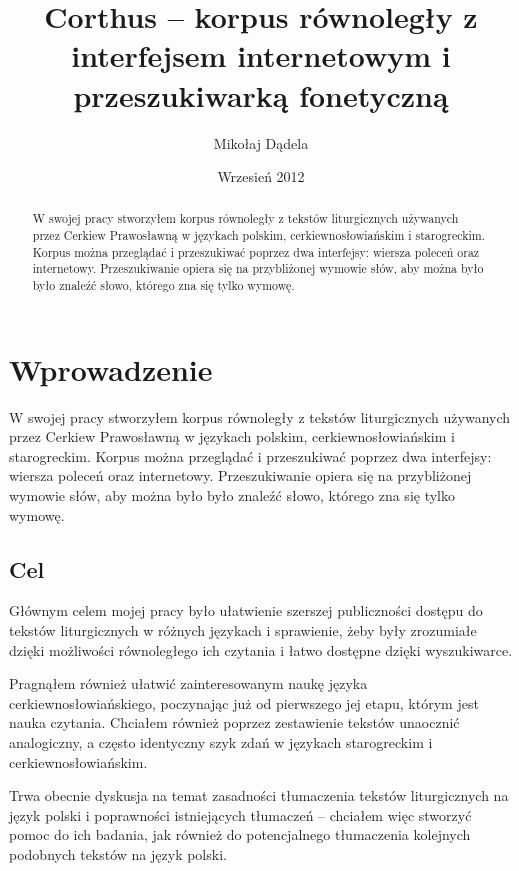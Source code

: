 \documentclass{pracamgr}
\author{Mikołaj Dądela}
\title{Corthus -- korpus równoległy z interfejsem internetowym i
  przeszukiwarką fonetyczną}
\date{Wrzesień 2012}
\begin{document}
\maketitle

\begin{abstract}
  W swojej pracy stworzyłem korpus równoległy z tekstów liturgicznych
  używanych przez Cerkiew Prawosławną w językach polskim,
  cerkiewno\-{}słowiańskim i staro\-{}greckim. Korpus można przeglądać i
  przeszukiwać poprzez dwa interfejsy: wiersza poleceń oraz
  internetowy. Przeszukiwanie opiera się na przybliżonej wymowie słów,
  aby można było było znaleźć słowo, którego zna się tylko wymowę.
\end{abstract}

\tableofcontents


\chapter{Wprowadzenie}

W swojej pracy stworzyłem korpus równoległy z tekstów liturgicznych
używanych przez Cerkiew Prawosławną w językach polskim,
cerkiewno\-{}słowiańskim i staro\-{}greckim. Korpus można przeglądać i
przeszukiwać poprzez dwa interfejsy: wiersza poleceń oraz
internetowy. Przeszukiwanie opiera się na przybliżonej wymowie słów,
aby można było było znaleźć słowo, którego zna się tylko wymowę.

\section{Cel}\label{cel}

Głównym celem mojej pracy było ułatwienie szerszej publiczności
dostępu do tekstów liturgicznych w różnych językach i sprawienie, żeby
były zrozumiałe dzięki możliwości równoległego ich czytania i łatwo
dostępne dzięki wyszukiwarce.

Pragnąłem również ułatwić zainteresowanym naukę języka
cerkiewno\-{}słowiańskiego, poczynając już od pierwszego jej etapu, którym
jest nauka czytania. Chciałem również poprzez zestawienie tekstów
unaocznić analogiczny, a często identyczny szyk zdań w językach
starogreckim i cerkiewno\-{}słowiańskim.

Trwa obecnie dyskusja na temat zasadności tłumaczenia tekstów
liturgicznych na język polski i poprawności istniejących tłumaczeń --
chciałem więc stworzyć pomoc do ich badania, jak również do
potencjalnego tłumaczenia kolejnych podobnych tekstów na język
polski.
\end{document}
